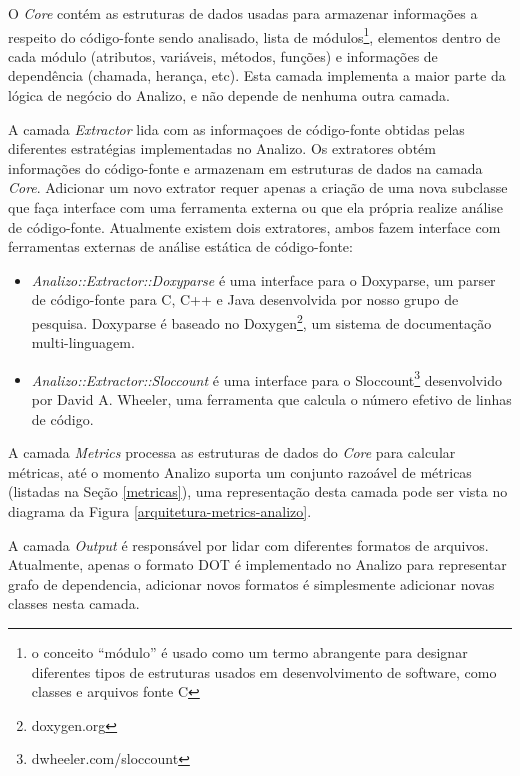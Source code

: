 O {\it Core} contém as estruturas de dados usadas para armazenar informações a
respeito do código-fonte sendo analisado, lista de módulos\footnote{o
conceito ``módulo'' é usado como um termo abrangente para designar diferentes
tipos de estruturas usados em desenvolvimento de software, como classes e
arquivos fonte C}, elementos dentro de cada módulo (atributos, variáveis,
métodos, funções) e informações de dependência (chamada, herança, etc). Esta
camada implementa a maior parte da lógica de negócio do Analizo, e não depende
de nenhuma outra camada.

A camada {\it Extractor} lida com as informaçoes de código-fonte obtidas pelas
diferentes estratégias implementadas no Analizo. Os extratores obtém
informações do código-fonte e armazenam em estruturas de dados na camada {\it
Core}. Adicionar um novo extrator requer apenas a criação de uma nova subclasse
que faça interface com uma ferramenta externa ou que ela própria realize análise
de código-fonte. Atualmente existem dois extratores, ambos fazem interface
com ferramentas externas de análise estática de código-fonte:

\begin{itemize}

  \item {\it Analizo::Extractor::Doxyparse} é uma interface para o Doxyparse,
  um parser de código-fonte para C, C++ e Java desenvolvida por nosso grupo de
  pesquisa\cite{Costa2009}. Doxyparse é baseado no
  Doxygen\footnote{doxygen.org}, um sistema de documentação multi-linguagem.

  \item {\it Analizo::Extractor::Sloccount} é uma interface para o
  Sloccount\footnote{dwheeler.com/sloccount} desenvolvido por David A. Wheeler,
  uma ferramenta que calcula o número efetivo de linhas de código.

\end{itemize}

A camada {\it Metrics} processa as estruturas de dados do {\it Core} para
calcular métricas, até o momento Analizo suporta um conjunto razoável de
métricas (listadas na Seção \ref{metricas}), uma representação desta camada
pode ser vista no diagrama da Figura \ref{arquitetura-metrics-analizo}.

A camada {\it Output} é responsável por lidar com diferentes formatos de
arquivos.  Atualmente, apenas o formato DOT é implementado no Analizo para
representar grafo de dependencia, adicionar novos formatos é simplesmente
adicionar novas classes nesta camada.

